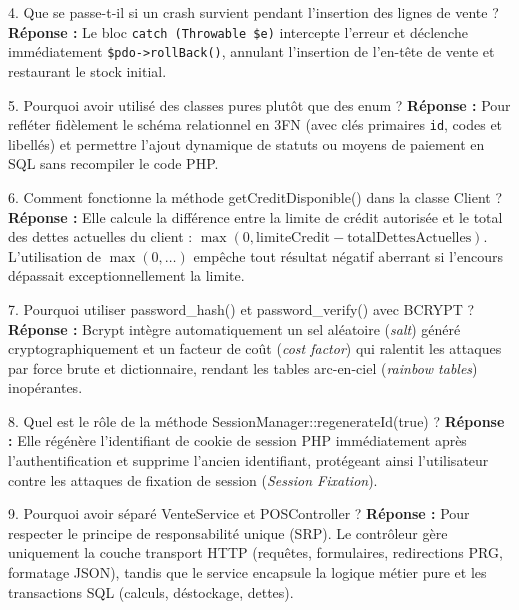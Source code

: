 \documentclass[11pt,a4paper,titlepage,twoside,openright]{report}
\begin{document}
\begin{oralbox}{4. Que se passe-t-il si un crash survient pendant l'insertion des lignes de vente ?}
\textbf{Réponse :} Le bloc \texttt{catch (Throwable \$e)} intercepte l'erreur et déclenche immédiatement \texttt{\$pdo->rollBack()}, annulant l'insertion de l'en-tête de vente et restaurant le stock initial.
\end{oralbox}

\begin{oralbox}{5. Pourquoi avoir utilisé des classes pures plutôt que des enum ?}
\textbf{Réponse :} Pour refléter fidèlement le schéma relationnel en 3FN (avec clés primaires \texttt{id}, codes et libellés) et permettre l'ajout dynamique de statuts ou moyens de paiement en SQL sans recompiler le code PHP.
\end{oralbox}

\begin{oralbox}{6. Comment fonctionne la méthode getCreditDisponible() dans la classe Client ?}
\textbf{Réponse :} Elle calcule la différence entre la limite de crédit autorisée et le total des dettes actuelles du client : $\max(0, \text{limiteCredit} - \text{totalDettesActuelles})$. L'utilisation de $\max(0, \dots)$ empêche tout résultat négatif aberrant si l'encours dépassait exceptionnellement la limite.
\end{oralbox}

\begin{oralbox}{7. Pourquoi utiliser password\_hash() et password\_verify() avec BCRYPT ?}
\textbf{Réponse :} Bcrypt intègre automatiquement un sel aléatoire (\emph{salt}) généré cryptographiquement et un facteur de coût (\emph{cost factor}) qui ralentit les attaques par force brute et dictionnaire, rendant les tables arc-en-ciel (\emph{rainbow tables}) inopérantes.
\end{oralbox}

\begin{oralbox}{8. Quel est le rôle de la méthode SessionManager::regenerateId(true) ?}
\textbf{Réponse :} Elle régénère l'identifiant de cookie de session PHP immédiatement après l'authentification et supprime l'ancien identifiant, protégeant ainsi l'utilisateur contre les attaques de fixation de session (\emph{Session Fixation}).
\end{oralbox}

\begin{oralbox}{9. Pourquoi avoir séparé VenteService et POSController ?}
\textbf{Réponse :} Pour respecter le principe de responsabilité unique (SRP). Le contrôleur gère uniquement la couche transport HTTP (requêtes, formulaires, redirections PRG, formatage JSON), tandis que le service encapsule la logique métier pure et les transactions SQL (calculs, déstockage, dettes).
\end{oralbox}
\end{document}

